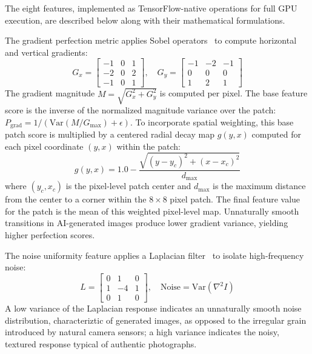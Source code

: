 \documentclass[runningheads]{llncs}
\begin{document}
The eight features, implemented as TensorFlow-native operations for full GPU execution, are described below along with their mathematical formulations.

The gradient perfection metric applies Sobel operators~\cite{kanopoulos1988design} to compute horizontal and vertical gradients:
\begin{equation}
G_x = \begin{bmatrix} -1 & 0 & 1 \\ -2 & 0 & 2 \\ -1 & 0 & 1 \end{bmatrix}, \quad
G_y = \begin{bmatrix} -1 & -2 & -1 \\ 0 & 0 & 0 \\ 1 & 2 & 1 \end{bmatrix}
\end{equation}
The gradient magnitude $M = \sqrt{G_x^2 + G_y^2}$ is computed per pixel. The base feature score is the inverse of the normalized magnitude variance over the patch: $P_{\text{grad}} = 1 / (\text{Var}(M / G_{\text{max}}) + \epsilon)$. To incorporate spatial weighting, this base patch score is multiplied by a centered radial decay map $g(y,x)$ computed for each pixel coordinate $(y,x)$ within the patch:
\begin{equation}
g(y,x) = 1.0 - \frac{\sqrt{(y - y_c)^2 + (x - x_c)^2}}{d_{\text{max}}}
\label{eq:radialdecay}
\end{equation}
where $(y_c, x_c)$ is the pixel-level patch center and $d_{\text{max}}$ is the maximum distance from the center to a corner within the $8 \times 8$ pixel patch. The final feature value for the patch is the mean of this weighted pixel-level map. Unnaturally smooth transitions in AI-generated images produce lower gradient variance, yielding higher perfection scores.

The noise uniformity feature applies a Laplacian filter~\cite{gonzalez2002digital} to isolate high-frequency noise:
\begin{equation}
L = \begin{bmatrix} 0 & 1 & 0 \\ 1 & -4 & 1 \\ 0 & 1 & 0 \end{bmatrix}, \quad \text{Noise} = \text{Var}(\nabla^2 I)
\end{equation}
A low variance of the Laplacian response indicates an unnaturally smooth noise distribution, characteriztic of generated images, as opposed to the irregular grain introduced by natural camera sensors; a high variance indicates the noisy, textured response typical of authentic photographs.
\end{document}
